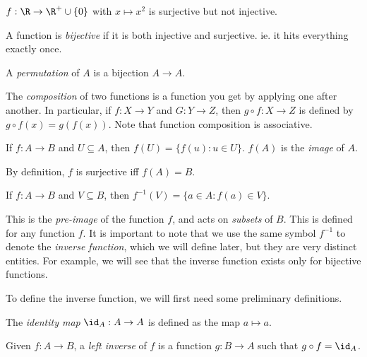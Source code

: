 \documentclass[a4paper]{article}
\begin{document}
\begin{eg}
  $f: \R \to\R^+\cup\{0\}$ with $x \mapsto x^2$ is surjective but not injective.
\end{eg}

\begin{defi}
  A function is \emph{bijective} if it is both injective and surjective. ie. it hits everything exactly once.
\end{defi}

\begin{defi}[Permutation]
  A \emph{permutation} of $A$ is a bijection $A\to A$.
\end{defi}

\begin{defi}
  The \emph{composition} of two functions is a function you get by applying one after another. In particular, if $f: X \rightarrow Y$ and $G: Y\rightarrow Z$, then $g\circ f: X \rightarrow Z$ is defined by $g\circ f(x) = g(f(x))$. Note that function composition is associative.
\end{defi}

\begin{defi}
  If $f: A\to B$ and $U\subseteq A$, then $f(U) = \{f(u):u\in U\}$. $f(A)$ is the \emph{image} of $A$.
\end{defi}
By definition, $f$ is surjective iff $f(A) = B$.

\begin{defi}
  If $f: A\to B$ and $V\subseteq B$, then $f^{-1}(V) = \{a\in A: f(a)\in V\}$.
\end{defi}
This is the \emph{pre-image} of the function $f$, and acts on \emph{subsets} of $B$. This is defined for any function $f$. It is important to note that we use the same symbol $f^{-1}$ to denote the \emph{inverse function}, which we will define later, but they are very distinct entities. For example, we will see that the inverse function exists only for bijective functions.

To define the inverse function, we will first need some preliminary definitions.

\begin{defi}
  The \emph{identity map} $\id _A: A\to A$ is defined as the map $a\mapsto a$.
\end{defi}

\begin{defi}
  Given $f: A\to B$, a \emph{left inverse} of $f$ is a function $g:B\to A$ such that $g\circ f = \id _A$.
\end{defi}
\end{document}

